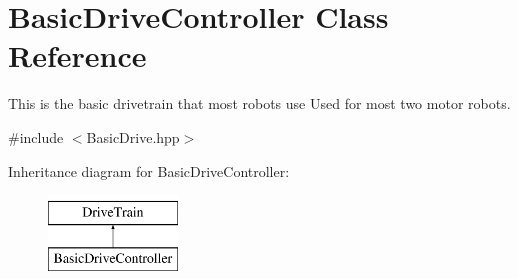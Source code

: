 \hypertarget{class_basic_drive_controller}{}\section{Basic\+Drive\+Controller Class Reference}
\label{class_basic_drive_controller}


This is the basic drivetrain that most robots use Used for most two motor robots.  




{\ttfamily \#include $<$Basic\+Drive.\+hpp$>$}

Inheritance diagram for Basic\+Drive\+Controller\+:\begin{figure}[H]
\begin{center}
\leavevmode
\includegraphics[height=2.000000cm]{class_basic_drive_controller}
\end{center}
\end{figure}
